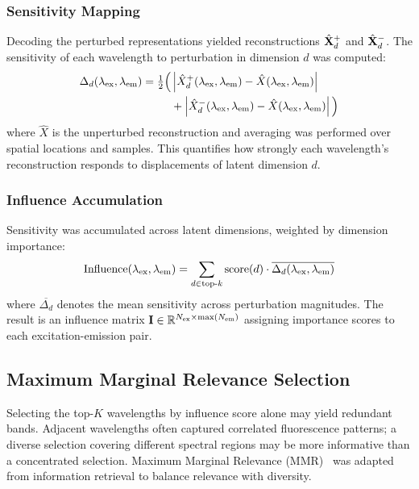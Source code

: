 \subsubsection{Sensitivity Mapping}
Decoding the perturbed representations yielded reconstructions $\hat{\mathbf{X}}^{+}_d$ and $\hat{\mathbf{X}}^{-}_d$.
The sensitivity of each wavelength to perturbation in dimension $d$ was computed:
\begin{equation}
\begin{split}
\Delta_d(\lambda_{\text{ex}}, \lambda_{\text{em}}) = \tfrac{1}{2}\Big( &\left| \hat{X}^{+}_d(\lambda_{\text{ex}}, \lambda_{\text{em}}) - \hat{X}(\lambda_{\text{ex}}, \lambda_{\text{em}}) \right| \\
&+ \left| \hat{X}^{-}_d(\lambda_{\text{ex}}, \lambda_{\text{em}}) - \hat{X}(\lambda_{\text{ex}}, \lambda_{\text{em}}) \right| \Big)
\end{split}
\label{eq:sensitivity}
\end{equation}
where $\hat{X}$ is the unperturbed reconstruction and averaging was performed over spatial locations and samples.
This quantifies how strongly each wavelength's reconstruction responds to displacements of latent dimension $d$.

\subsubsection{Influence Accumulation}
Sensitivity was accumulated across latent dimensions, weighted by dimension importance:
\begin{equation}
\text{Influence}(\lambda_{\text{ex}}, \lambda_{\text{em}}) = \sum_{d \in \text{top-}k} \text{score}(d) \cdot \overline{\Delta_d(\lambda_{\text{ex}}, \lambda_{\text{em}})}
\label{eq:influence}
\end{equation}
where $\overline{\Delta_d}$ denotes the mean sensitivity across perturbation magnitudes.
The result is an influence matrix $\mathbf{I} \in \mathbb{R}^{N_{\text{ex}} \times \max(N_{\text{em}})}$ assigning importance scores to each excitation-emission pair.

\subsection{Maximum Marginal Relevance Selection}
\label{sec:mmr}

Selecting the top-$K$ wavelengths by influence score alone may yield redundant bands.
Adjacent wavelengths often captured correlated fluorescence patterns; a diverse selection covering different spectral regions may be more informative than a concentrated selection.
Maximum Marginal Relevance (MMR)~\cite{carbonell1998use} was adapted from information retrieval to balance relevance with diversity.

